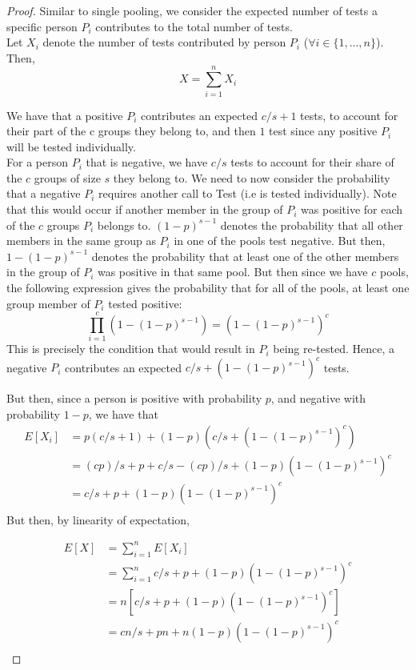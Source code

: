 \documentclass[12pt]{article}
\begin{document}
\begin{proof}

Similar to single pooling, we consider the expected number of tests a specific person $P_i$ contributes to the total number of tests. \\

Let $X_i$ denote the number of tests contributed by person $P_i$ ($\forall i \in \{1,...,n\}$). Then, $$X=\sum\limits_{i=1}^{n}X_i$$

We have that a positive $P_i$ contributes an expected $c/s + 1$ tests, to account for their part of the c groups they belong to, and then $1$ test since any positive $P_i$ will be tested individually. \\

For a person $P_i$ that is negative, we have $c/s$ tests to account for their share of the $c$ groups of size $s$ they belong to. We need to now consider the probability that a negative $P_i$ requires another call to {\sf Test} (i.e is tested individually). Note that this would occur if another member in the group of $P_i$ was positive for each of the $c$ groups $P_i$ belongs to. $(1-p)^{s-1}$ denotes the probability that all other members in the same group as $P_i$ in one of the pools test negative. But then, $1-(1-p)^{s-1}$ denotes the probability that at least one of the other members in the group of $P_i$ was positive in that same pool. But then since we have $c$ pools, the following expression gives the probability that for all of the pools, at least one group member of $P_i$ tested positive: $$\prod\limits_{i=1}^{c}(1-(1-p)^{s-1}) = (1-(1-p)^{s-1})^{c}$$ This is precisely the condition that would result in $P_i$ being re-tested. Hence, a negative $P_i$ contributes an expected $c/s+(1-(1-p)^{s-1})^{c}$ tests. 

But then, since a person is positive with probability $p$, and negative with probability $1-p$, we have that
\begin{align*}
E[X_i]&=p(c/s+1)+(1-p)(c/s+(1-(1-p)^{s-1})^{c}) \\
        &=(cp)/s+p+c/s-(cp)/s+(1-p)(1-(1-p)^{s-1})^{c} \\
        &=c/s +p+(1-p)(1-(1-p)^{s-1})^{c} \\
\end{align*}    
But then, by linearity of expectation,


\begin{align*}
E[X]&=\sum\limits_{i=1}^{n}E[X_i] \\
      &= \sum\limits_{i=1}^{n}{c/s +p+(1-p)(1-(1-p)^{s-1})^{c}} \\ 
      &= n[{c/s +p+(1-p)(1-(1-p)^{s-1})^{c}}] \\
      &= {cn/s +pn+n(1-p)(1-(1-p)^{s-1})^{c}} \\
\end{align*}      




\end{proof}
\end{document}
